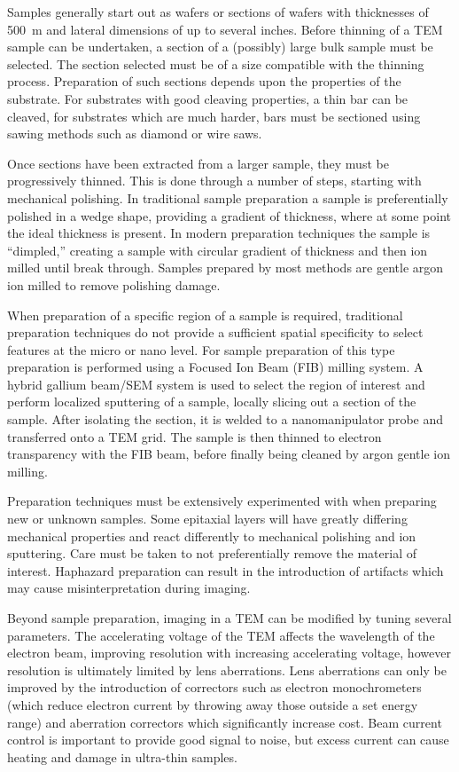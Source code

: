 Samples generally start out as wafers or sections of wafers with thicknesses of 500~\micro{}m and lateral dimensions of up to several inches.
Before thinning of a TEM sample can be undertaken, a section of a (possibly) large bulk sample must be selected.
The section selected must be of a size compatible with the thinning process.
Preparation of such sections depends upon the properties of the substrate.
For substrates with good cleaving properties, a thin bar can be cleaved, for substrates which are much harder, bars must be sectioned using sawing methods such as diamond or wire saws.

Once sections have been extracted from a larger sample, they must be progressively thinned.
This is done through a number of steps, starting with mechanical polishing.
In traditional sample preparation a sample is preferentially polished in a wedge shape, providing a gradient of thickness, where at some point the ideal thickness is present.
In modern preparation techniques the sample is ``dimpled,'' creating a sample with circular gradient of thickness and then ion milled until break through.
Samples prepared by most methods are gentle argon ion milled to remove polishing damage.

When preparation of a specific region of a sample is required, traditional preparation techniques do not provide a sufficient spatial specificity to select features at the micro or nano level.
For sample preparation of this type preparation is performed using a Focused Ion Beam (FIB) milling system.
A hybrid gallium beam/SEM system is used to select the region of interest and perform localized sputtering of a sample, locally slicing out a section of the sample.
After isolating the section, it is welded to a nanomanipulator probe and transferred onto a TEM grid.
The sample is then thinned to electron transparency with the FIB beam, before finally being cleaned by argon gentle ion milling.

Preparation techniques must be extensively experimented with when preparing new or unknown samples.
Some epitaxial layers will have greatly differing mechanical properties and react differently to mechanical polishing and ion sputtering.
Care must be taken to not preferentially remove the material of interest.
Haphazard preparation can result in the introduction of artifacts which may cause misinterpretation during imaging.

Beyond sample preparation, imaging in a TEM can be modified by tuning several parameters.
The accelerating voltage of the TEM affects the wavelength of the electron beam, improving resolution with increasing accelerating voltage\cite{Kohl2008}, however resolution is ultimately limited by lens aberrations.
Lens aberrations can only be improved by the introduction of correctors such as electron monochrometers (which reduce electron current by throwing away those outside a set energy range) and aberration correctors which significantly increase cost.
Beam current control is important to provide good signal to noise, but excess current can cause heating and damage in ultra-thin samples.

